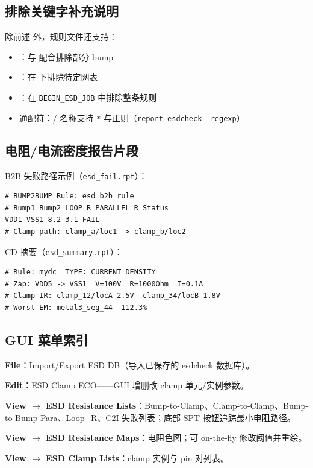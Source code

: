 \subsection{排除关键字补充说明}
除前述  外，规则文件还支持：
\begin{itemize}
  \item {}：与  配合排除部分 bump
  \item {}：在  下排除特定网表
  \item {}：在 \texttt{BEGIN_ESD_JOB} 中排除整条规则
  \item 通配符：/ 名称支持 \texttt{*} 与正则（\texttt{report esdcheck -regexp}）
\end{itemize}

\subsection{电阻/电流密度报告片段}
B2B 失败路径示例（\texttt{esd\_fail.rpt}）：
\begin{lstlisting}
# BUMP2BUMP Rule: esd_b2b_rule
# Bump1 Bump2 LOOP_R PARALLEL_R Status
VDD1 VSS1 8.2 3.1 FAIL
# Clamp path: clamp_a/loc1 -> clamp_b/loc2
\end{lstlisting}

CD 摘要（\texttt{esd\_summary.rpt}）：
\begin{lstlisting}
# Rule: mydc  TYPE: CURRENT_DENSITY
# Zap: VDD5 -> VSS1  V=100V  R=1000Ohm  I=0.1A
# Clamp IR: clamp_12/locA 2.5V  clamp_34/locB 1.8V
# Worst EM: metal3_seg_44  112.3%
\end{lstlisting}

\subsection{GUI 菜单索引}
\textbf{File}：Import/Export ESD DB（导入已保存的 esdcheck 数据库）。

\textbf{Edit}：ESD Clamp ECO——GUI 增删改 clamp 单元/实例参数。

\textbf{View $\rightarrow$ ESD Resistance Lists}：Bump-to-Clamp、Clamp-to-Clamp、Bump-to-Bump Para、Loop\_R、C2I 失败列表；底部 SPT 按钮追踪最小电阻路径。

\textbf{View $\rightarrow$ ESD Resistance Maps}：电阻色图；可 on-the-fly 修改阈值并重绘。

\textbf{View $\rightarrow$ ESD Clamp Lists}：clamp 实例与 pin 对列表。

